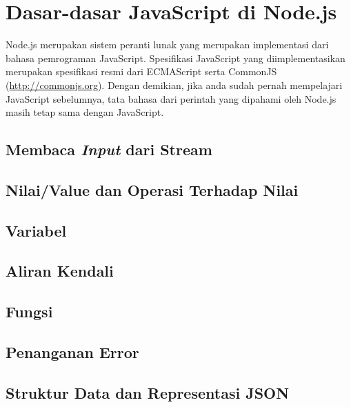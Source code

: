 \section{Dasar-dasar JavaScript di Node.js}

Node.js merupakan sistem peranti lunak yang merupakan implementasi dari bahasa pemrograman JavaScript. Spesifikasi JavaScript yang diimplementasikan merupakan spesifikasi resmi dari ECMAScript serta CommonJS (\url{http://commonjs.org}). Dengan demikian, jika anda sudah pernah mempelajari JavaScript sebelumnya, tata bahasa dari perintah yang dipahami oleh Node.js masih tetap sama dengan JavaScript. 

\subsection{Membaca \textit{Input} dari Stream}

\subsection{Nilai/Value dan Operasi Terhadap Nilai}


\subsection{Variabel}


\subsection{Aliran Kendali}

\subsection{Fungsi}

\subsection{Penanganan Error}

\subsection{Struktur Data dan Representasi JSON}

